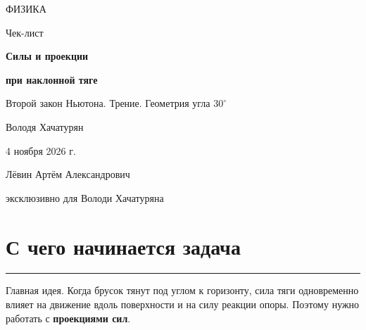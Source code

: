 \documentclass[a4paper,12pt]{article}
\newcommand{\ruleline}{\par\vspace{2pt}\noindent\textcolor{accent}{\rule{\linewidth}{0.55pt}}\par\vspace{1pt}}
\newcommand{\secname}[1]{\section{#1}\ruleline}
\begin{document}
\thispagestyle{empty}
\begin{center}
\vspace*{20mm}
{\Large\color{darkaccent} ФИЗИКА}\par
\vspace{15mm}
{\LARGE Чек-лист}\par
\vspace{16mm}
{\Large\color{accent}\bfseries Силы и проекции}\par
{\Large\color{accent}\bfseries при наклонной тяге}\par
\vspace{16mm}
{\normalsize Второй закон Ньютона. Трение. Геометрия угла $30^\circ$}\par
\vfill
{\large Володя Хачатурян}\par
\vspace{9mm}
{4 ноября 2026 г.}\par
\vspace{14mm}
{\small Лёвин Артём Александрович}\par
{\small эксклюзивно для Володи Хачатуряна}\par
\vspace{14mm}
\end{center}
\clearpage
{}
\setcounter{page}{1}

\secname{С чего начинается задача}

\textcolor{darkaccent}{Главная идея.} Когда брусок тянут под углом к горизонту, сила тяги одновременно влияет на движение вдоль поверхности и на силу реакции опоры. Поэтому нужно работать с \textbf{проекциями сил}.
\end{document}
